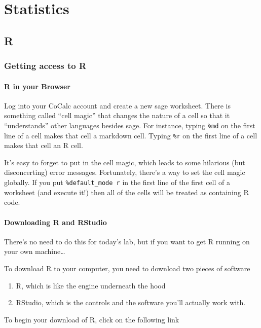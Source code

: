  
\chapter{Statistics}


\section{R}
\label{sec:r}

\subsection{Getting access to R}

\subsubsection{R in your Browser}

Log into your CoCalc account and create a new sage worksheet. There is something called ``cell magic'' that changes the nature of a cell so that it ``understands'' other languages besides sage.  For instance, typing \verb+%md+ on the first line of a cell makes that cell a markdown cell.  Typing \verb+%r+ on the first line of a cell makes that cell an R cell.

It's easy to forget to put in the cell magic, which leads to some hilarious (but disconcerting) error messages.  Fortunately, there's a way to set the cell magic globally.
If you put \verb+%default_mode r+ in the first line of the first cell of a worksheet (and execute it!) then all of the cells will be treated as containing R code.

\subsubsection{Downloading R and RStudio}

There's no need to do this for today's lab, but if you want to get R running on your own machine\dots

To download R to your computer, you need to download two pieces of software
\begin{enumerate}
\item R, which is like the engine underneath the hood
\item RStudio, which is the controls and the software you'll actually work with.
\end{enumerate}

To begin your download of R, click on the following link

